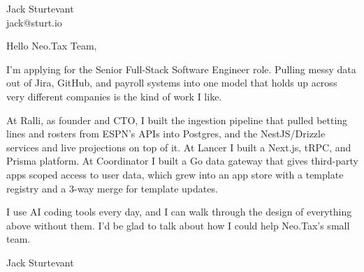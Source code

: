 \documentclass[11pt]{article}
\begin{document}
\raggedright

{\namefont\fontsize{20pt}{24pt}\selectfont Jack Sturtevant}\\[-0.3em]
jack@sturt.io

\vspace{1.2em}

Hello Neo.Tax Team,

I'm applying for the Senior Full-Stack Software Engineer role. Pulling messy data out of Jira, GitHub, and payroll systems into one model that holds up across very different companies is the kind of work I like.

At Ralli, as founder and CTO, I built the ingestion pipeline that pulled betting lines and rosters from ESPN's APIs into Postgres, and the NestJS/Drizzle services and live projections on top of it. At Lancer I built a Next.js, tRPC, and Prisma platform. At Coordinator I built a Go data gateway that gives third-party apps scoped access to user data, which grew into an app store with a template registry and a 3-way merge for template updates.

I use AI coding tools every day, and I can walk through the design of everything above without them. I'd be glad to talk about how I could help Neo.Tax's small team.

\vspace{0.6em}
Jack Sturtevant
\end{document}
